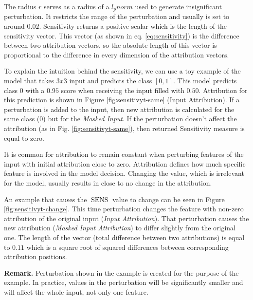 The radius $r$ serves as a radius of a $l_p norm$ used to generate insignificant perturbation. It restricts the range of the perturbation and usually is set to around $0.02$. Sensitivity returns a positive scalar which is the length of the sensitivity vector. This vector (as shown in eq. \ref{eq:sensitivity}) is the difference between two attribution vectors, so the absolute length of this vector is proportional to the difference in every dimension of the attribution vectors.



\vspace{2\baselineskip}

To explain the intuition behind the sensitivity, we can use a toy example of the model that takes $3x3$ input and predicts the class $[0,1]$. This model predicts class $0$ with a $0.95$ score when receiving the input filled with $0.50$. Attribution for this prediction is shown in Figure \ref{fig:sensitivyt-same} (Input Attribution). If a perturbation is added to the input, then new attribution is calculated for the same class ($0$) but for the \textit{Masked Input}. If the perturbation doesn't affect the attribution (as in Fig. \ref{fig:sensitivyt-same}), then returned Sensitivity measure is equal to zero.

\vspace{\baselineskip}

It is common for attribution to remain constant when perturbing features of the input with initial attribution close to zero. Attribution defines how much specific feature is involved in the model decision. Changing the value, which is irrelevant for the model, usually results in close to no change in the attribution.

\vspace{\baselineskip}

An example that causes the $\operatorname{SENS}$ value to change can be seen in Figure \ref{fig:sensitivyt-change}. This time perturbation changes the feature with non-zero attribution of the original input (\textit{Input Attribution}). That perturbation causes the new attribution (\textit{Masked Input Attribution}) to differ slightly from the original one. The length of the vector (total difference between two attributions) is equal to $0.11$ which is a square root of squared differences between corresponding attribution positions.

\vspace{\baselineskip}

\textbf{Remark.} Perturbation shown in the example is created for the purpose of the example. In practice, values in the perturbation will be significantly smaller and will affect the whole input, not only one feature.